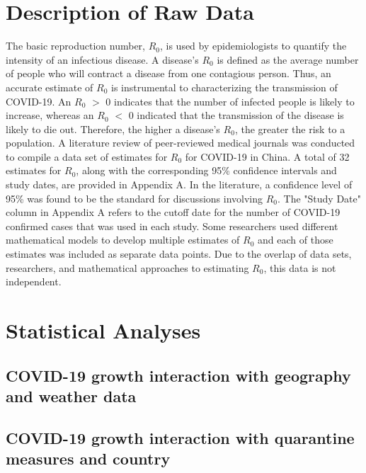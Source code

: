 \documentclass{article}
\begin{document}
\section{Description of Raw Data}







The basic reproduction number, $R_0$, is used by epidemiologists to quantify the intensity of an infectious disease. A disease’s $R_0$ is defined as the average number of people who will contract a disease from one contagious person. Thus, an accurate estimate of $R_0$ is instrumental to characterizing the transmission of COVID-19. An $R_0$ $>$ 0 indicates that the number of infected people is likely to increase, whereas an $R_0$ $<$ 0 indicated that the transmission of the disease is likely to die out. Therefore, the higher a disease’s $R_0$, the greater the risk to a population. A literature review of peer-reviewed medical journals was conducted to compile a data set of estimates for $R_0$ for COVID-19 in China. A total of 32 estimates for $R_0$, along with the corresponding 95\% confidence intervals and study dates, are provided in Appendix A. In the literature, a confidence level of 95\% was found to be the standard for discussions involving $R_0$. The "Study Date" column in Appendix A refers to the cutoff date for the number of COVID-19 confirmed cases that was used in each study. Some researchers used different mathematical models to develop multiple estimates of $R_0$ and each of those estimates was included as separate data points. Due to the overlap of data sets, researchers, and mathematical approaches to estimating $R_0$, this data is not independent.

\section{Statistical Analyses}

\subsection{COVID-19 growth interaction with geography and weather data}

\subsection{COVID-19 growth interaction with quarantine measures and country}

\end{document}
